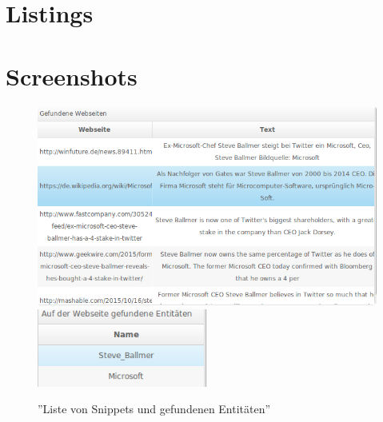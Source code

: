 \chapter{Listings}

\lstset{language=Java}


\lstset{language=Java}


\lstset{language=Java}


\lstset{language=python}


\lstset{language=Java}



\clearpage
\chapter{Screenshots}

\begin{figure}
\centering
\includegraphics[width=1\textwidth]{Bilder/evalstep02-step1.png}
\includegraphics[width=0.5\textwidth]{Bilder/evalstep02-step1-2.png}
\caption{''Liste von Snippets und gefundenen Entitäten''}
\label{fig:eval-entitylist}
\end{figure}

